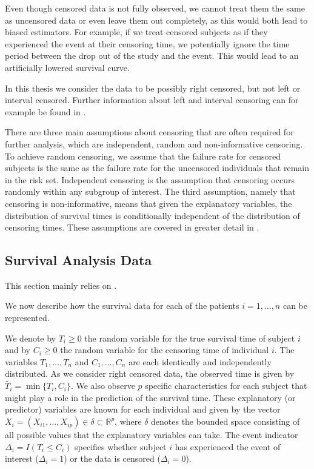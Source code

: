 \documentclass[12pt, a4paper]{scrartcl}
\theoremstyle{definition}
\theoremstyle{plain}
\numberwithin{equation}{section}
\numberwithin{figure}{section}
\numberwithin{table}{section}
\begin{document}
	Even though censored data is not fully observed, we cannot treat them the same as uncensored data or even leave them out completely, as this would both lead to biased estimators.
	For example, if we treat censored subjects as if they experienced the event at their censoring time, we potentially ignore the time period between the drop out of the study and the event.
	This would lead to an artificially lowered survival curve.
		
	In this thesis we consider the data to be possibly right censored, but not left or interval censored.
	Further information about left and interval censoring can for example be found in \citet*{bookfailuretime}.
	
	There are three main assumptions about censoring that are often required for further analysis, which are independent, random and non-informative censoring.
	To achieve random censoring, we assume that the failure rate for censored subjects is the same as the failure rate for the uncensored individuals that remain in the risk set.
	Independent censoring is the assumption that censoring occurs randomly within any subgroup of interest.
	The third assumption, namely that censoring is non-informative, means that given the explanatory variables, the distribution of survival times is conditionally independent of the distribution of censoring times.
	These assumptions are covered in greater detail in \citet*{bookfailuretime}.
	
	
	\subsection{Survival Analysis Data} \label{sabasics}
	
	This section mainly relies on \citet*{sabook}.
	
	We now describe how the survival data for each of the patients $i = 1, \dots, n$ can be represented.
	
	We denote by $T_i \geq 0$ the random variable for the true survival time of subject $i$ and by $C_i \geq 0$ the random variable for the censoring time of individual $i$.
	The variables $T_1,\dots,T_n$ and $C_1,\dots,C_n$ are each identically and independently distributed.
	As we consider right censored data, the observed time is given by $\tilde{T_i} = \min\{T_i,C_i\}$.
	We also observe $p$ specific characteristics for each subject that might play a role in the prediction of the survival time.
	These explanatory (or predictor) variables are known for each individual and given by the vector $X_i = (X_{i1}, \dots , X_{ip}) \in \delta \subset \mathbb{R}^p$, where $\delta$ denotes the bounded space consisting of all possible values that the explanatory variables can take.
	The event indicator $\Delta_i = I(T_i \leq C_i)$ specifies whether subject $i$ has experienced the event of interest ($\Delta_i=1$) or the data is censored ($\Delta_i=0$).
	
\end{document}
